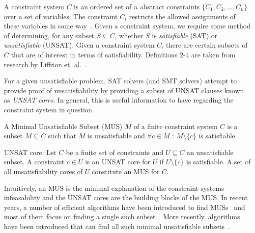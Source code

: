 A constraint system $C$ is an ordered set of $n$ abstract constraints $\{C_1, C_2, ..., C_n\}$ over a set of variables. The constraint $C_i$ restricts the allowed assignments of these variables in some way~\cite{liffiton2016fast}. Given a constraint system, we require some method of determining, for any subset $S \subseteq C$, whether $S$ is \textit{satisfiable} (SAT) or \textit{unsatisfiable} (UNSAT). Given a constraint system $C$, there are certain subsets of $C$ that are of interest in terms of satisfiability. Definitions 2-4 are taken from research by Liffiton et. al.~\cite{liffiton2016fast}. 

For a given unsatisfiable problem, SAT solvers (and SMT solvers) attempt to provide proof of unsatisfiability by providing a subset of UNSAT clauses known as \textit{UNSAT cores}. In general, this is useful information to have regarding the constraint system in question. 

\begin{definition} A Minimal Unsatisfiable Subset (MUS) $M$ of a finite constraint system $C$ is a subset $M \subseteq C$ such that $M$ is unsatisfiable and $\forall c \in M$ : $M \setminus \{c\}$ is satisfiable. 
\end{definition}

\begin{definition} UNSAT core: Let $C$ be a finite set of constraints and $U \subseteq C$ an unsatisfiable subset. A constraint $c \in U$ is an UNSAT core for $U$ if $U \setminus \{c\}$ is satisfiable. A set of all unsatisfiability cores of $U$ constitute an MUS for $C$. 
\end{definition}

Intuitively, an MUS is the minimal explanation of the constraint systems infeasability and the UNSAT cores are the building blocks of the MUS. In recent years, a number of efficient algorithms have been introduced to find MUSs~\cite{liffiton2005max} and most of them focus on finding a single such subset~\cite{belov2012towards, belov2013core, belov2012muser2}. More recently, algorithms have been introduced that can find all such minimal unsatisfiable subsets~\cite{GhassabaniGW16, Ghassabani2017EfficientGO,bendik2018online}. 


